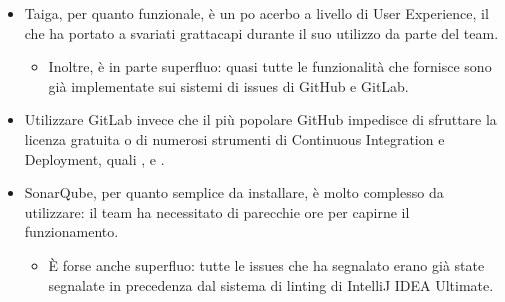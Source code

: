 \documentclass[letterpaper,10pt,italian]{sphinxmanual}
\begin{document}
\begin{itemize}
\begin{itemize}
\begin{itemize}
\item {} 
\sphinxAtStartPar
L\textquotesingle{}installazione di Taiga tramite Docker Compose ha richiesto 5 ore, in quanto una race condition presente nel
file  impediva al software di raggiungere il database.

\item {} 
\sphinxAtStartPar
L\textquotesingle{}installazione e manutenzione di GitLab ha richiesto 5 ore, e richiede competenze di amministrazione di sistema
avanzate che sono oltre il livello dello studente medio del terzo anno di Informatica.

\end{itemize}

\item {} 
\sphinxAtStartPar
Taiga, per quanto funzionale, è un po\textquotesingle{} acerbo a livello di User Experience, il che ha portato a svariati grattacapi
durante il suo utilizzo da parte del team.
\begin{itemize}
\item {} 
\sphinxAtStartPar
Inoltre, è in parte superfluo: quasi tutte le funzionalità che fornisce sono già implementate sui sistemi di issues
di GitHub e GitLab.

\end{itemize}

\item {} 
\sphinxAtStartPar
Utilizzare GitLab invece che il più popolare GitHub impedisce di sfruttare la licenza gratuita o  di
numerosi strumenti di Continuous Integration e Deployment, quali ,  e .

\item {} 
\sphinxAtStartPar
SonarQube, per quanto semplice da installare, è molto complesso da utilizzare: il team ha necessitato di parecchie
ore per capirne il funzionamento.
\begin{itemize}
\item {} 
\sphinxAtStartPar
È forse anche superfluo: tutte le issues che ha segnalato erano già state segnalate in precedenza dal sistema di
linting di IntelliJ IDEA Ultimate.

\end{itemize}

\end{itemize}


\end{itemize}
\end{document}
